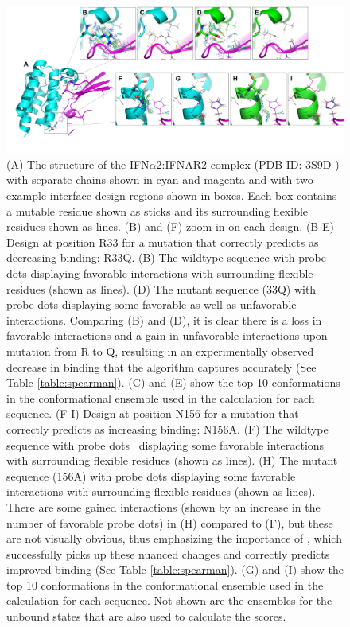 \begin{figure}
 \center
 \includegraphics[width=\textwidth]{figures/designExamples.png}
 \vspace{-0.5in}%
 \caption{(A) The structure of the IFN$\alpha$2:IFNAR2 complex (PDB ID: 3S9D \cite{pdb3s9d}) with separate chains shown in cyan and magenta and with two example interface design regions shown in boxes. Each box contains a mutable residue shown as sticks and its surrounding flexible residues shown as lines. (B) and (F) zoom in on each design. (B-E) Design at position R33 for a mutation that \osprey correctly predicts as decreasing binding: R33Q. (B) The wildtype sequence with probe dots \cite{Probe,PIV} displaying favorable interactions with surrounding flexible residues (shown as lines). (D) The mutant sequence (33Q) with probe dots displaying some favorable as well as unfavorable interactions. Comparing (B) and (D), it is clear there is a loss in favorable interactions and a gain in unfavorable interactions upon mutation from R to Q, resulting in an experimentally observed decrease in binding that the \ks algorithm captures accurately (See Table \ref{table:spearman}). (C) and (E) show the top 10 conformations in the conformational ensemble used in the \ks calculation for each sequence. (F-I) Design at position N156 for a mutation that \osprey correctly predicts as increasing binding: N156A. (F) The wildtype sequence with probe dots~\cite{Probe,PIV} displaying some favorable interactions with surrounding flexible residues (shown as lines). (H) The mutant sequence (156A) with probe dots displaying some favorable interactions with surrounding flexible residues (shown as lines). There are some gained interactions (shown by an increase in the number of favorable probe dots) in (H) compared to (F), but these are not visually obvious, thus emphasizing the importance of \ks, which successfully picks up these nuanced changes and correctly predicts improved binding (See Table \ref{table:spearman}). (G) and (I) show the top 10 conformations in the conformational ensemble used in the \ks calculation for each sequence. Not shown are the ensembles for the unbound states that are also used to calculate the \ks scores.}
\label{fig:designs}
\end{figure}

